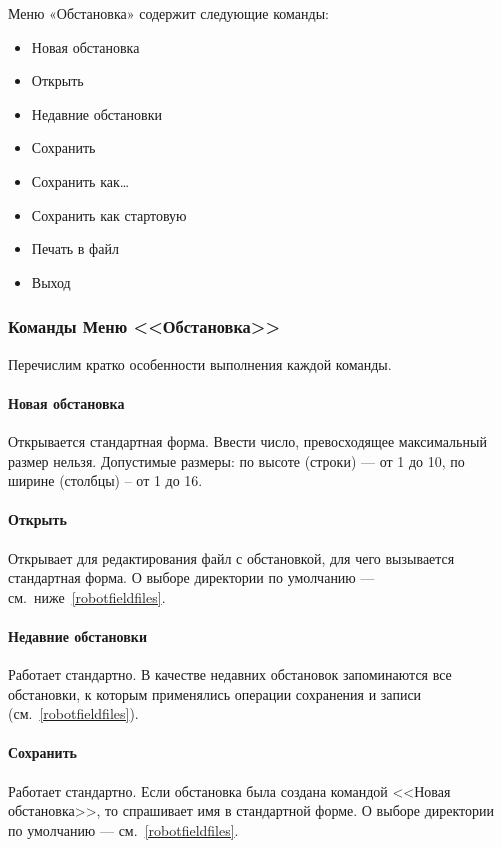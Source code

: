 \documentclass[12pt,a4paper]{article}
\begin{document}
Меню «Обстановка» содержит следующие команды:
\begin{itemize}
\item Новая обстановка
\item Открыть
\item Недавние обстановки
\item Сохранить
\item Сохранить как\dots
\item Сохранить как стартовую
\item Печать в файл
\item Выход
\end{itemize}

\subsubsection[Команды Меню ''Обстановка'']{Команды Меню <<Обстановка>>}

Перечислим кратко особенности выполнения каждой команды.

\paragraph{Новая обстановка} Открывается стандартная форма. Ввести число, превосходящее максимальный размер нельзя. Допустимые размеры: по высоте (строки) --- от 1 до 10, по ширине (столбцы) – от 1 до 16.

\paragraph{Открыть} Открывает для редактирования файл с обстановкой, для чего  вызывается стандартная форма. О выборе директории по умолчанию --- см.~ниже~\ref{robotfieldfiles}.

\paragraph{Недавние обстановки} Работает стандартно. В качестве недавних обстановок запоминаются все обстановки, к которым применялись операции сохранения и записи (см.~\ref{robotfieldfiles}).

\paragraph{Сохранить} Работает стандартно. Если обстановка была создана командой <<Новая обстановка>>, то спрашивает имя в стандартной форме. О выборе директории по умолчанию --- см.~\ref{robotfieldfiles}.
\end{document}
